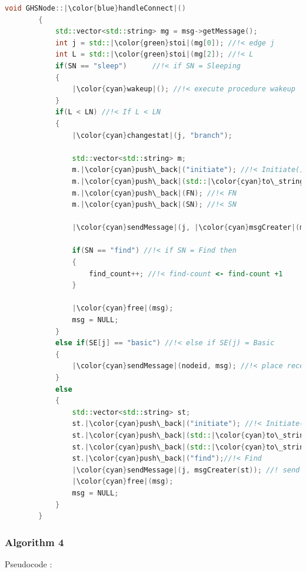 \documentclass[letterpaper,11pt]{article}
\begin{document}
	
	\begin{lstlisting}[language=C++, caption= handleConnect()]
		void GHSNode::|\color{blue}handleConnect|()
		{
			std::vector<std::string> mg = msg->getMessage();
			int j = std::|\color{green}stoi|(mg[0]); //!< edge j
			int L = std::|\color{green}stoi|(mg[2]); //!< L
			if(SN == "sleep")      //!< if SN = Sleeping 
			{
				|\color{cyan}wakeup|(); //!< execute procedure wakeup
			}
			if(L < LN) //!< If L < LN
			{
				|\color{cyan}changestat|(j, "branch");
				
				std::vector<std::string> m; 
				m.|\color{cyan}push\_back|("initiate"); //!< Initiate()
				m.|\color{cyan}push\_back|(std::|\color{cyan}to\_string|(LN)); //!< LN
				m.|\color{cyan}push\_back|(FN); //!< FN
				m.|\color{cyan}push\_back|(SN); //!< SN
				
				|\color{cyan}sendMessage|(j, |\color{cyan}msgCreater|(m)); //!< send Initiate(LN, FN, SN) on edge j 
				
				if(SN == "find") //!< if SN = Find then
				{
					find_count++; //!< find-count <- find-count +1
				}
				
				|\color{cyan}free|(msg);
				msg = NULL;
			}
			else if(SE[j] == "basic") //!< else if SE(j) = Basic
			{
				|\color{cyan}sendMessage|(nodeid, msg); //!< place receieved message on end of queue
			}
			else
			{
				std::vector<std::string> st; 
				st.|\color{cyan}push\_back|("initiate"); //!< Initiate()
				st.|\color{cyan}push\_back|(std::|\color{cyan}to\_string|(LN+1)); //!< LN +1
				st.|\color{cyan}push\_back|(std::|\color{cyan}to\_string|(nbd[j]));//!< w(j)
				st.|\color{cyan}push\_back|("find");//!< Find
				|\color{cyan}sendMessage|(j, msgCreater(st)); //! send Initiate(LN+1, w(j), Find) on edge j
				|\color{cyan}free|(msg);
				msg = NULL;
			}
		}
	\end{lstlisting}
	
	\newpage
	
	\subsubsection{Algorithm 4}
	Pseudocode : \\
	
\end{document}
